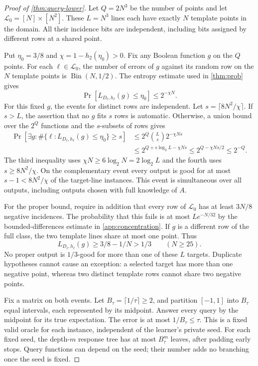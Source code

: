 \begin{proof}[Proof of \cref{thm:query-lower}]
Let $Q=2N^3$ be the number of points and let $\mathcal L_0=[N]\times[N^2]$. These $L=N^3$ lines each have exactly $N$ template points in the domain. All their incidence bits are independent, including bits assigned by different rows at a shared point.

Put $\eta_0=3/8$ and $\chi=1-h_2(\eta_0)>0$. Fix any Boolean function $g$ on the $Q$ points. For each $\ell\in\mathcal L_0$, the number of errors of $g$ against its random row on the $N$ template points is $\operatorname{Bin}(N,1/2)$. The entropy estimate used in \cref{thm:prob} gives
\[
 \Pr[L_{D_\ell,h_\ell}(g)\le\eta_0]
 \le 2^{-\chi N}.
\]
For this fixed $g$, the events for distinct rows are independent. Let $s=\lceil8N^2/\chi\rceil$. If $s>L$, the assertion that no $g$ fits $s$ rows is automatic. Otherwise, a union bound over the $2^Q$ functions and the $s$-subsets of rows gives
\begin{align*}
 \Pr[\exists g:\#\{\ell:L_{D_\ell,h_\ell}(g)\le\eta_0\}\ge s]
 &\le 2^Q\binom Ls2^{-\chi Ns}\\
 &\le 2^{Q+s\log_2L-\chi Ns}
 \le2^{Q-\chi Ns/2}
 \le2^{-Q}.
\end{align*}
The third inequality uses $\chi N\ge6\log_2N=2\log_2L$ and the fourth uses $s\ge8N^2/\chi$. On the complementary event every output is good for at most $s-1<8N^2/\chi$ of the target-line instances. This event is simultaneous over all outputs, including outputs chosen with full knowledge of $A$.

For the proper bound, require in addition that every row of $\mathcal L_0$ has at least $3N/8$ negative incidences. The probability that this fails is at most $L e^{-N/32}$ by the bounded-differences estimate in \cref{app:concentration}. If $g$ is a different row of the full class, the two template lines share at most one point. Thus
\[
 L_{D_\ell,h_\ell}(g)\ge3/8-1/N>1/3
 \qquad(N\ge25).
\]
No proper output is $1/3$-good for more than one of these $L$ targets. Duplicate hypotheses cannot cause an exception: a selected target has more than one negative point, whereas two distinct template rows cannot share two negative points.

Fix a matrix on both events. Let $B_\tau=\lceil1/\tau\rceil\ge2$, and partition $[-1,1]$ into $B_\tau$ equal intervals, each represented by its midpoint. Answer every query by the midpoint for its true expectation. The error is at most $1/B_\tau\le\tau$. This is a fixed valid oracle for each instance, independent of the learner's private seed. For each fixed seed, the depth-$m$ response tree has at most $B_\tau^m$ leaves, after padding early stops. Query functions can depend on the seed; their number adds no branching once the seed is fixed.


\end{proof}
